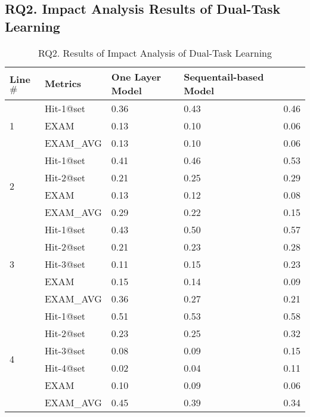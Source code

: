 \subsection{\bf RQ2. Impact Analysis Results of Dual-Task Learning}

\iffalse

\begin{table}[b]
	\caption{RQ2. Results of Impact Analysis of Dual-Task Learning}
        \vspace{-12pt}
	{\small
		\begin{center}
			\renewcommand{\arraystretch}{1}
			\begin{tabular}{p{1cm}<{\centering}|p{1.5cm}<{\centering}|p{1.5cm}<{\centering}|p{1.5cm}<{\centering}|p{1.2cm}<{\centering}}
				\hline
				Line$\#$ & Metrics & One Layer Model & Sequentail-based Model & \tool \\
				\hline
				\multirow{3}{*}{1}  & Hit-1@set     & 0.36 & 0.43 & 0.46  \\
									& EXAM          & 0.13 & 0.10 & 0.06  \\
									& EXAM\_AVG     & 0.13 & 0.10 & 0.06  \\
				\hline
				\multirow{4}{*}{2}  & Hit-1@set     & 0.41 & 0.46 & 0.53  \\
									& Hit-2@set     & 0.21 & 0.25 & 0.29  \\
									& EXAM          & 0.13 & 0.12 & 0.08  \\
									& EXAM\_AVG     & 0.29 & 0.22 & 0.15 \\
				\hline
				\multirow{5}{*}{3}  & Hit-1@set     & 0.43 & 0.50 & 0.57 \\
									& Hit-2@set     & 0.21 & 0.23 & 0.28 \\
									& Hit-3@set     & 0.11 & 0.15 & 0.23 \\
									& EXAM          & 0.15 & 0.14 & 0.09 \\
									& EXAM\_AVG     & 0.36 & 0.27 & 0.21 \\
				\hline
				\multirow{6}{*}{4}  & Hit-1@set     & 0.51 & 0.53 & 0.58 \\
									& Hit-2@set     & 0.23 & 0.25 & 0.32 \\
									& Hit-3@set     & 0.08 & 0.09 & 0.15 \\
									& Hit-4@set     & 0.02 & 0.04 & 0.11 \\
									& EXAM          & 0.10 & 0.09 & 0.06 \\
									& EXAM\_AVG     & 0.45 & 0.39 & 0.34 \\

\end{tabular}
\end{center}}
\end{table}
